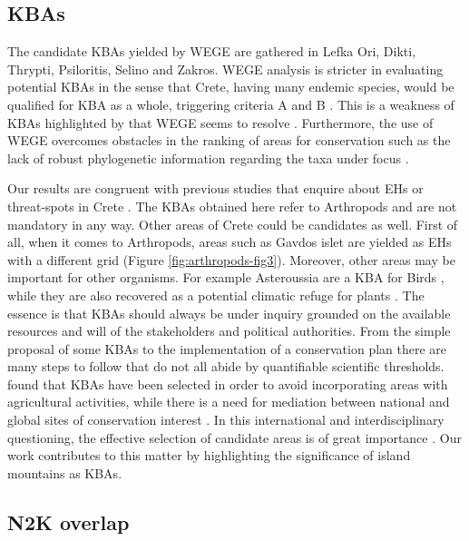     \subsection{KBAs}
    \label{subsec:arthropods-KBAs}
    
The candidate KBAs yielded by WEGE are gathered in Lefka Ori, Dikti, Thrypti,
Psiloritis, Selino and Zakros. WEGE analysis is stricter in evaluating
potential KBAs in the sense that Crete, having many endemic species, would be
qualified for KBA as a whole, triggering criteria A and B \parencite{iucn2016}.
This is a weakness of KBAs highlighted by \parencite{farooq2023a-call} that WEGE seems
to resolve \parencite{farooq2020wege}. Furthermore, the use of WEGE overcomes
obstacles in the ranking of areas for conservation such as the lack of robust
phylogenetic information regarding the taxa under focus \parencite{farooq2020wege}.

Our results are congruent with previous studies that enquire about EHs or
threat-spots in Crete \parencite{dimitrakopoulos2004questioning,kougioumoutzis2020plant,kougioumoutzis2021extinction}.
The KBAs obtained here refer to Arthropods and are not mandatory in any way.
Other areas of Crete could be candidates as well. First of all, when it comes to
Arthropods, areas such as Gavdos islet are yielded as EHs with a different grid (Figure \ref{fig:arthropods-fig3}).
Moreover, other areas may be important for other organisms. For example Asteroussia
are a KBA for Birds \parencite{kbas2024}, while they are
also recovered as a potential climatic refuge for plants \parencite{kougioumoutzis2020plant}.
The essence is that KBAs should always be under inquiry grounded on the available
resources and will of the stakeholders and political authorities. From the
simple proposal of some KBAs to the implementation of a conservation plan there
are many steps to follow that do not all abide by quantifiable scientific
thresholds. \textcite{venter2018bias} found that KBAs have been selected in order to
avoid incorporating areas with agricultural activities, while there is a need
for mediation between national and global sites of conservation
interest \parencite{kougioumoutzis2020plant,lim2023global}. In this international
and interdisciplinary questioning, the effective selection of candidate areas
is of great importance \parencite{plumptre2024targeting}. Our work contributes to this
matter by highlighting the significance of island mountains as KBAs.

    \subsection{N2K overlap}
    \label{subsec:arthropods-N2K-overlap}

